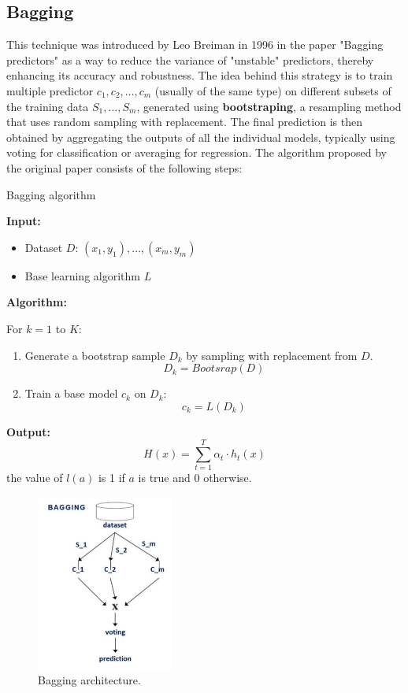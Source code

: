 \subsection{Bagging}
This technique was introduced by Leo Breiman in 1996 in the paper "Bagging predictors" \cite{breiman1996bagging} as a way to reduce the variance of "unstable" predictors, thereby enhancing its accuracy and robustness. The idea behind this strategy is to train multiple predictor $c_1, c_2, \dots, c_m$ (usually of the same type) on different subsets of the training data $S_1, \dots, S_m$, generated using \textbf{bootstraping}, a resampling method that uses random sampling with replacement. The final prediction is then obtained by aggregating the outputs of all the individual models, typically using voting for classification or averaging for regression. The algorithm proposed by the original paper consists of the following steps: 
\begin{tcolorbox}[colback=blue!5, colframe=blue!80, boxrule=0pt]
    \begin{algorithm} [H]
        \caption{Bagging algorithm}
        \label{alg:Bagging algorithm}
        \textbf{Input:}
        \begin{itemize}
            \item Dataset $D$: ${(x_1, y_1),\dots,(x_m, y_m)}$
            \item Base learning algorithm $L$
        \end{itemize}
        \textbf{Algorithm:}
        
        For $k = 1$ to $K$:
        \begin{enumerate}
             \item  Generate a bootstrap sample $D_k$ by sampling with replacement from $D$.
             \[
             D_k = Bootsrap (D)
             \]
            \item Train a base model $c_k$ on $D_k$:
            \[
            c_k = L(D_k)
            \]
        \end{enumerate}
        \textbf{Output:}
        \[
        H(x) = \sum_{t=1}^{T} \alpha_t \cdot h_t(x)
        \]
        the value of $l(a)$ is 1 if $a$ is true and 0 otherwise.
    \end{algorithm}
\end{tcolorbox}
\begin{figure}[H] 
    \centering
    \includegraphics[width=0.40\textwidth]{Machine_learning_thesis/Images/Bagging.png}
    \caption{Bagging architecture.} 
    \label{fig:Bagging} 
\end{figure}

